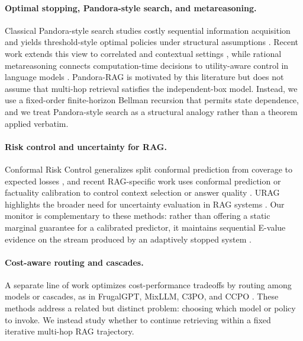 \documentclass{article}
\newcommand{\method}{Pandora-RAG}
\begin{document}
\paragraph{Optimal stopping, Pandora-style search, and metareasoning.}
Classical Pandora-style search studies costly sequential information acquisition and yields threshold-style optimal policies under structural assumptions \citep{weitzmanOptimalSearchBest1979}. Recent work extends this view to correlated and contextual settings \citep{chawlaPandorasBoxCorrelations2020,gergatsouliWeitzmansRulePandoras2023,atsidakouContextualPandorasBox2024}, while rational metareasoning connects computation-time decisions to utility-aware control in language models \citep{sabbataRationalMetareasoningLarge2025}. \method{} is motivated by this literature but does not assume that multi-hop retrieval satisfies the independent-box model. Instead, we use a fixed-order finite-horizon Bellman recursion that permits state dependence, and we treat Pandora-style search as a structural analogy rather than a theorem applied verbatim.

\paragraph{Risk control and uncertainty for RAG.}
Conformal Risk Control generalizes split conformal prediction from coverage to expected losses \citep{angelopoulosConformalRiskControl2024}, and recent RAG-specific work uses conformal prediction or factuality calibration to control context selection or answer quality \citep{chakrabortyPrincipledContextEngineering2026,fengResponseQualityAssessment2025}. URAG highlights the broader need for uncertainty evaluation in RAG systems \citep{nguyenURAGBenchmarkUncertainty2026}. Our monitor is complementary to these methods: rather than offering a static marginal guarantee for a calibrated predictor, it maintains sequential E-value evidence on the stream produced by an adaptively stopped system \citep{shaferTestingBettingStrategy2021,grunwaldSafeTesting2024}.

\paragraph{Cost-aware routing and cascades.}
A separate line of work optimizes cost-performance tradeoffs by routing among models or cascades, as in FrugalGPT, MixLLM, C3PO, and CCPO \citep{chenFrugalGPTHowUse2023,wangMixLLMDynamicRouting2025a,valkanasC3POOptimizedLarge2025,siConformalConstrainedPolicy2026}. These methods address a related but distinct problem: choosing which model or policy to invoke. We instead study whether to continue retrieving within a fixed iterative multi-hop RAG trajectory.
\end{document}
